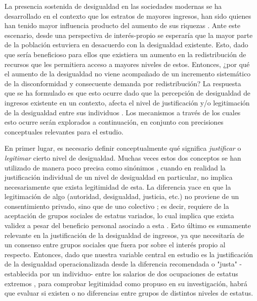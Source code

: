 \documentclass[12pt]{article}
\begin{document}
La presencia sostenida de  desigualdad en las sociedades modernas se ha desarrollado en el contexto que los estratos de mayores ingresos, han sido quienes han tenido mayor influencia producto del aumento de sus riquezas \citep{Atkinson2011,Volscho2012}. Ante este escenario, desde una perspectiva de interés-propio \citep{Meltzer1981} se esperaría que la mayor parte de la población estuviera en desacuerdo con la desigualdad existente. Esto, dado que sería beneficioso para ellos que existiera un aumento en la redistribución de recursos que les permitiera acceso a mayores niveles de estos. Entonces, ¿por qué el aumento de la desigualdad no viene acompañado de un incremento sistemático de la disconformidad y consecuente demanda por redistribución? La respuesta que se ha formulado es que esto ocurre dado que la percepción de desigualdad de ingresos existente en un contexto, afecta el nivel de justificación y/o legitimación de la desigualdad entre sus individuos \citep{Trump2017, Castilloetal2019}. Los mecanismos a través de los cuales esto ocurre serán explorados a continuación, en conjunto con precisiones conceptuales relevantes para el estudio. 

En primer lugar, es necesario definir conceptualmente qué significa \textit{justificar} o \textit{legitimar} cierto nivel de desigualdad. Muchas veces estos dos conceptos se han utilizado de manera poco precisa como sinónimos \cite{Castillo2011}, cuando en realidad la justificación individual de un nivel de desigualdad en particular, no implica necesariamente que exista legitimidad de esta. La diferencia yace en que la legitimación de algo (autoridad, desigualdad, justicia, etc.) no proviene de un consentimiento privado, sino que de uno colectivo  \citep{Walker1993}; es decir, requiere de la aceptación de grupos sociales de estatus variados, lo cual implica que exista validez a pesar del beneficio personal asociado a esta \citep{Weber1947}. Esto último es sumamente relevante en la justificación de la desigualdad de ingresos, ya que necesitaría de un consenso entre grupos sociales que fuera por sobre el interés propio al respecto. Entonces, dado que nuestra variable central en estudio es la justificación de la desigualdad operacionalizada desde la diferencia recomendada o "justa" -establecida por un individuo- entre los salarios de dos ocupaciones de estatus extremos , para comprobar legitimidad como propuso \cite{Castillo2011} en su investigación, habrá que evaluar si existen o no diferencias entre grupos de distintos niveles de estatus.
\end{document}
